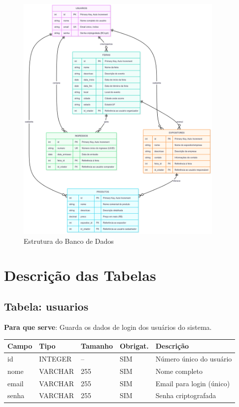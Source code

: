 \documentclass[12pt,a4paper]{article}
\begin{document}
\begin{figure}[htbp]
    \centering
    \includegraphics[width=0.9\textwidth]{diagrams/banco_dados_er.png}
    \caption{Estrutura do Banco de Dados}
    \label{fig:diagrama_er}
\end{figure}

\section{Descrição das Tabelas}

\subsection{Tabela: usuarios}

\textbf{Para que serve}: Guarda os dados de login dos usuários do sistema.

\begin{longtable}{|p{3cm}|p{2cm}|p{2cm}|p{1.5cm}|p{5cm}|}
\hline
\textbf{Campo} & \textbf{Tipo} & \textbf{Tamanho} & \textbf{Obrigat.} & \textbf{Descrição} \\
\hline
\endhead
id & INTEGER & -- & SIM & Número único do usuário \\
\hline
nome & VARCHAR & 255 & SIM & Nome completo \\
\hline
email & VARCHAR & 255 & SIM & Email para login (único) \\
\hline
senha & VARCHAR & 255 & SIM & Senha criptografada \\
\hline
\end{longtable}
\end{document}
